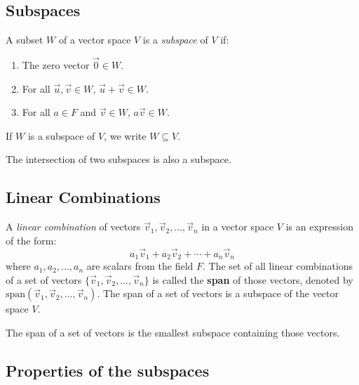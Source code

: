 \subsection{Subspaces}

A subset \(W\) of a vector space \(V\) is a \emph{subspace} of \(V\) if:

\begin{enumerate}[label=\Roman*.]
	\item The zero vector \(\vec{0} \in W\).
	\item For all \(\vec{u}, \vec{v} \in W\), \(\vec{u} + \vec{v} \in W\).
	\item For all \(a \in F\) and \(\vec{v} \in W\), \(a\vec{v} \in W\).
\end{enumerate}
If \(W\) is a subspace of \(V\), we write \(W \subseteq V\).
\vspace{\baselineskip}

The intersection of two subspaces is also a subspace.

\subsection{Linear Combinations}

A \emph{linear combination} of vectors \(\vec{v}_1, \vec{v}_2, \ldots, \vec{v}_n\) in a vector space \(V\) is an expression of
the form:
\[
	a_1\vec{v}_1 + a_2\vec{v}_2 + \cdots + a_n\vec{v}_n
\]
where \(a_1, a_2, \ldots, a_n\) are scalars from the field \(F\).
The set of all linear combinations of a set of vectors \(\{\vec{v}_1, \vec{v}_2, \ldots, \vec{v}_n\}\) is called the \textbf{span} of those vectors,
denoted by \(\text{span}(\vec{v}_1, \vec{v}_2, \ldots, \vec{v}_n)\).
The span of a set of vectors is a subspace of the vector space \(V\).
\vspace{\baselineskip}

The span of a set of vectors is the smallest subspace containing those vectors.

\subsection{Properties of the subspaces}

